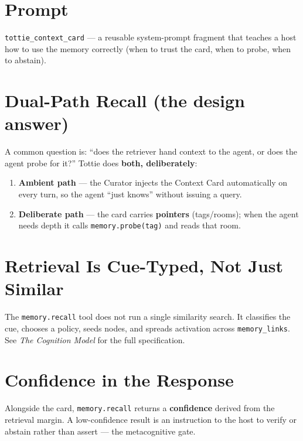 \section{Prompt}
\texttt{tottie\_context\_card} --- a reusable system-prompt fragment that teaches a host how to use
the memory correctly (when to trust the card, when to probe, when to abstain).

\section{Dual-Path Recall (the design answer)}
A common question is: ``does the retriever hand context to the agent, or does the agent probe for
it?'' Tottie does \textbf{both, deliberately}:
\begin{enumerate}
  \item \textbf{Ambient path} --- the Curator injects the Context Card automatically on every turn,
  so the agent ``just knows'' without issuing a query.
  \item \textbf{Deliberate path} --- the card carries \textbf{pointers} (tags/rooms); when the agent
  needs depth it calls \texttt{memory.probe(tag)} and reads that room.
\end{enumerate}

\section{Retrieval Is Cue-Typed, Not Just Similar}
The \texttt{memory.recall} tool does not run a single similarity search. It classifies the cue,
chooses a policy, seeds nodes, and spreads activation across \texttt{memory\_links}. See
\emph{The Cognition Model} for the full specification.

\section{Confidence in the Response}
Alongside the card, \texttt{memory.recall} returns a \textbf{confidence} derived from the retrieval
margin. A low-confidence result is an instruction to the host to verify or abstain rather than
assert --- the metacognitive gate.
